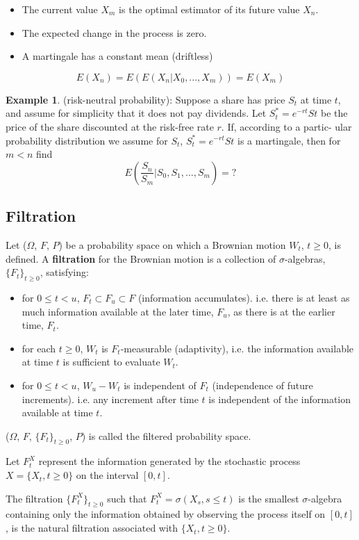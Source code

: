 \documentclass[11pt,a4paper]{book}
\theoremstyle{definition}\newtheorem{definition}{Definition}
\theoremstyle{definition}\newtheorem{fact}{Fact}
\theoremstyle{definition}\newtheorem{remark}{Remark}
\theoremstyle{definition}\newtheorem{ex}{Ex.}
\theoremstyle{definition}\newtheorem{project}{Project}
\theoremstyle{definition}\newtheorem{problem}{Problem}
\theoremstyle{definition}\newtheorem{example}{Example}
\numberwithin{theorem}{section}
\numberwithin{corollary}{chapter}
\numberwithin{assumption}{chapter}
\numberwithin{definition}{chapter}
\numberwithin{prop}{chapter}
\numberwithin{notation}{chapter}
\numberwithin{problem}{chapter}
\numberwithin{example}{chapter}
\numberwithin{fact}{chapter}
\numberwithin{ex}{chapter}
\begin{document}
\begin{itemize}[label={$\Rightarrow$}]
\item The current value $X_m$ is the optimal estimator of its future value $X_n$. 
\item The expected change in the process is zero.
\item A martingale has a constant mean (driftless)
\end{itemize}
$$E(X_n) = E(E(X_n | X_0, ..., X_m)) = E(X_m) $$
\begin{example}
(risk-neutral probability): Suppose a share has price $S_t$ at time $t$, and assume for simplicity that it does not pay dividends. Let $S_t^* = e^{-rt} St$ be the price of the share discounted at the risk-free rate $r$. If, according to a partic-
ular probability distribution we assume for $S_t$, $S_t^* = e^{-rt} St$ is a martingale, then for $m<n$ find
$$ E\left( \frac{S_n}{S_m} | S_0, S_1, ..., S_m \right) = ? $$
\end{example}

\subsection{Filtration}
Let ($\Omega$, $F$, $P$) be a probability space on which a Brownian motion $W_t$, $t \geq 0$, is defined. A \textbf{filtration} for the Brownian motion is a collection of $\sigma$-algebras, $\{F_t\}_{t\geq0}$, satisfying:
\begin{itemize}
\item for $0 \leq t < u$, $F_t \subset F_u \subset F$ (information accumulates). i.e. there is at least as much information available at the later time, $F_u$, as there is at the earlier time, $F_t$.
\item for each $t \geq 0$, $W_t$ is $F_t$-measurable (adaptivity), i.e. the information available at time $t$ is sufficient to evaluate $W_t$.
\item for $0\leq t<u$, $W_u - W_t$ is independent of $F_t$ (independence of future increments). i.e. any increment after time $t$ is independent of the information available at time $t$.
\end{itemize}
($\Omega$, $F$, $\{F_t\}_{t\geq0}$, $P$) is called the filtered probability space.

Let $F_t^X$ represent the information generated by the stochastic process $X=\{X_t, t\geq 0\}$ on the interval $[0, t ]$.

The filtration $\{F_t^X\}_{t \geq 0}$ such that $F_t^X = \sigma(X_s, s \leq t)$ is the smallest $\sigma$-algebra containing only the information obtained by observing the process itself on $[0,t]$, is the natural filtration associated with $\{X_t, t\geq 0\}$.
\end{document}
